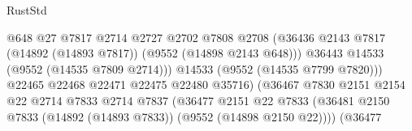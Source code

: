 \begin{lexlean}{RustStd}
\begin{coremodule}
                                                      @648
                                                      @27
                                                      @7817
                                                      @2714
                                                      @2727
                                                      @2702
                                                      @7808
                                                      @2708
                                                      (@36436
                                                        @2143
                                                        @7817
                                                        (@14892 (@14893 @7817))
                                                        (@9552 (@14898 @2143 @648)))
                                                      @36443
                                                      @14533
                                                      (@9552 (@14535 @7809 @2714)))
                                                    @14533
                                                    (@9552 (@14535 @7799 @7820)))
                                                  @22465
                                                  @22468
                                                  @22471
                                                  @22475
                                                  @22480
                                                  @35716)
                                                (@36467
                                                  @7830
                                                  @2151
                                                  @2154
                                                  @22
                                                  @2714
                                                  @7833
                                                  @2714
                                                  @7837
                                                  (@36477
                                                    @2151
                                                    @22
                                                    @7833
                                                    (@36481
                                                      @2150
                                                      @7833
                                                      (@14892 (@14893 @7833))
                                                      (@9552 (@14898 @2150 @22))))
                                                  (@36477

\end{coremodule}
\end{lexlean}

